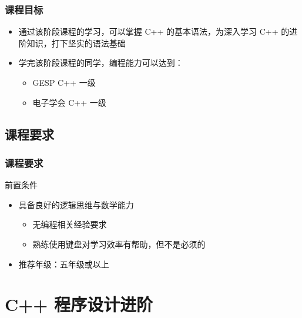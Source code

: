 \begin{frame}[fragile]
    \frametitle{课程目标}

    \begin{itemize}[<+->]
        \item 通过该阶段课程的学习，可以掌握 C++ 的基本语法，为深入学习 C++ 的进阶知识，打下坚实的语法基础

        \item 学完该阶段课程的同学，编程能力可以达到：

            \begin{itemize}
                \item GESP C++ 一级
                \item 电子学会 C++ 一级
            \end{itemize}

    \end{itemize}
\end{frame}

\subsection{课程要求}

\begin{frame}[fragile]
    \frametitle{课程要求}

    \begin{alertblock}{前置条件}
        \begin{itemize}
            \item 具备良好的逻辑思维与数学能力

                \begin{itemize}
                    \item 无编程相关经验要求
                    \item 熟练使用键盘对学习效率有帮助，但不是必须的
                \end{itemize}

            \item 推荐年级：五年级或以上
        \end{itemize}
    \end{alertblock}
\end{frame}


\section{C++ 程序设计进阶}

